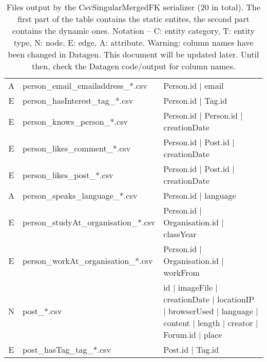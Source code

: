 \begin{table}[htb]
{\begin{tabular}{|c|l|l|}
            A                    & person\_email\_emailaddress\_*.csv   & Person.id | email                                                                                                   \\
            E                    & person\_hasInterest\_tag\_*.csv      & Person.id | Tag.id                                                                                                  \\
            E                    & person\_knows\_person\_*.csv         & Person.id | Person.id | creationDate                                                                                \\
            E                    & person\_likes\_comment\_*.csv        & Person.id | Post.id | creationDate                                                                                  \\
            E                    & person\_likes\_post\_*.csv           & Person.id | Post.id | creationDate                                                                                  \\
            A                    & person\_speaks\_language\_*.csv      & Person.id | language                                                                                                \\
            E                    & person\_studyAt\_organisation\_*.csv & Person.id | Organisation.id | classYear                                                                             \\
            E                    & person\_workAt\_organisation\_*.csv  & Person.id | Organisation.id | workFrom                                                                              \\\hline
            N                    & post\_*.csv                          & id | imageFile | creationDate | locationIP | browserUsed | language | content | length | creator | Forum.id | place \\
            E                    & post\_hasTag\_tag\_*.csv             & Post.id | Tag.id                                                                                                    \\\hline
        \end{tabular}}
    \caption{Files output by the CsvSingularMergedFK serializer (20 in total). The first part of the table contains the static entites, the second part contains the dynamic ones. Notation -- C: entity category, T: entity type, N: node, E: edge, A: attribute. Warning: column names have been changed in Datagen. This document will be updated later. Until then, check the Datagen code/output for column names.}
    \label{table:csv-singular-mergedfk}
\end{table}
